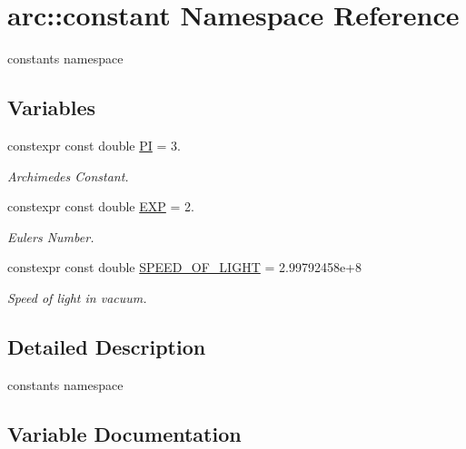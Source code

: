 \hypertarget{namespacearc_1_1constant}{}\section{arc\+:\+:constant Namespace Reference}
\label{namespacearc_1_1constant}


constants namespace  


\subsection*{Variables}
\begin{DoxyCompactItemize}
\item 
constexpr const double \mbox{\hyperlink{namespacearc_1_1constant_a3eccb0dc76feae32072ab77709824a47}{PI}} = 3.
\begin{DoxyCompactList}\small\item\em Archimedes\textquotesingle{} Constant. \end{DoxyCompactList}\item 
constexpr const double \mbox{\hyperlink{namespacearc_1_1constant_a9db9629d8a4236d7f102c667695b31cb}{E\+XP}} = 2.
\begin{DoxyCompactList}\small\item\em Euler\textquotesingle{}s Number. \end{DoxyCompactList}\item 
constexpr const double \mbox{\hyperlink{namespacearc_1_1constant_a7380a245f82a0bc10f7cc9b7140d4e14}{S\+P\+E\+E\+D\+\_\+\+O\+F\+\_\+\+L\+I\+G\+HT}} = 2.\+99792458e+8
\begin{DoxyCompactList}\small\item\em Speed of light in vacuum. \end{DoxyCompactList}\end{DoxyCompactItemize}


\subsection{Detailed Description}
constants namespace 

\subsection{Variable Documentation}
\mbox{\label{namespacearc_1_1constant_a9db9629d8a4236d7f102c667695b31cb}} 
